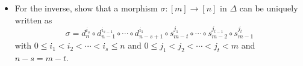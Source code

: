 \begin{Exercise}
\begin{itemize}
             \item  
             For the inverse, show that a morphism $ \sigma \colon [m] \to [n] $ in $ \Delta $ can be uniquely written as
            \[
                \sigma 
                =
                d_n^{i_s}
                \circ d_{ n - 1 }^{i_{s-1}} 
                \circ 
                \dotsm 
                \circ
                d_{ n - s + 1 }^{i_1}
                \circ
                s_{ m - t }^{j_1}
                \circ 
                \dotsm
                \circ
                s_{ m - 2 }^{ j_{t-1}}
                \circ 
                s_{ m - 1 }^{j_t}
            \]
            with $ 0 \leq i_1 < i_2 < \dotsm < i_s \leq n $ and $ 0 \leq j_1 < j_2 < \dotsm < j_t < m $ and $ n-s = m-t $.
        \end{itemize}
    \end{Exercise}
    
